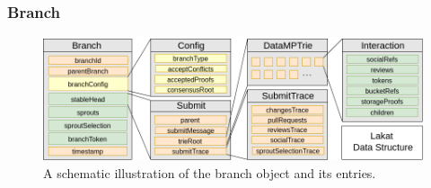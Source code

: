 \documentclass[14pt]{article}
\begin{document}
\subsubsection{Branch}
\label{ssc:branch}

\begin{figure}[t!]
\begin{center}
\includegraphics[width=\textwidth]{img/BranchV9.png}
\end{center}
 \caption{A schematic illustration of the branch object and its entries.}
 \label{fig:branchstructure}
\end{figure}
\end{document}
